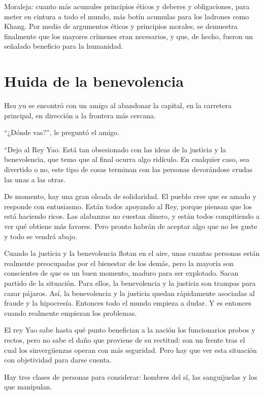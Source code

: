 \documentclass[book,b5paper,hidelinks,final]{memoir}
\begin{document}
	Moraleja: cuanto más acumules principios éticos y deberes y
	obligaciones, para meter en cintura a todo el mundo, más botín acumulas
	para los ladrones como Khang. Por medio de argumentos éticos y
	principios morales, se demuestra finalmente que los mayores crímenes
	eran necesarios, y que, de hecho, fueron un señalado beneficio para la
	humanidad.
	
	\chapter*{Huida de la benevolencia}
	
	Hsu yu se encontró con un amigo al abandonar la capital, en la carretera
	principal, en dirección a la frontera más cercana.
	
	``¿Dónde vas?'', le preguntó el amigo.
	
	``Dejo al Rey Yao. Está tan obsesionado con las ideas de la justicia y
	la benevolencia, que temo que al final ocurra algo ridículo. En
	cualquier caso, sea divertido o no, este tipo de cosas terminan con las
	personas devorándose crudas las unas a las otras.
	
	De momento, hay una gran oleada de solidaridad. El pueblo cree que es
	amado y responde con entusiasmo. Están todos apoyando al Rey, porque
	piensan que los está haciendo ricos. Las alabanzas no cuestan dinero, y
	están todos compitiendo a ver qué obtiene más favores. Pero pronto
	habrán de aceptar algo que no les guste y todo se vendrá abajo.
	
	Cuando la justicia y la benevolencia flotan en el aire, unas cuantas
	personas están realmente preocupadas por el bienestar de los demás, pero
	la mayoría son conscientes de que es un buen momento, maduro para ser
	explotado. Sacan partido de la situación. Para ellos, la benevolencia y
	la justicia son trampas para cazar pájaros. Así, la benevolencia y la
	justicia quedan rápidamente asociadas al fraude y la hipocresía.
	Entonces todo el mundo empieza a dudar. Y es entonces cuando realmente
	empiezan los problemas.
	
	El rey Yao sabe hasta qué punto benefician a la nación los funcionarios
	probos y rectos, pero no sabe el daño que proviene de su rectitud: son
	un frente tras el cual los sinvergüenzas operan con más seguridad. Pero
	hay que ver esta situación con objetividad para darse cuenta.
	
	Hay tres clases de personas para considerar: hombres del sí, las
	sanguijuelas y los que manipulan.
	
\end{document}
